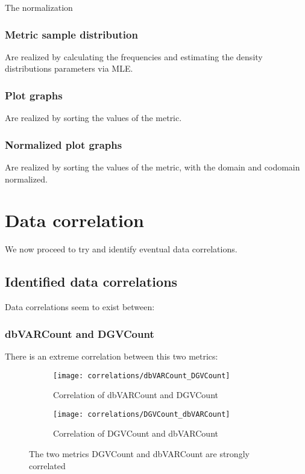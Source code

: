 The normalization

\subsection{Metric sample distribution}
Are realized by calculating the frequencies and estimating the density distributions parameters via MLE.

\subsection{Plot graphs}
Are realized by sorting the values of the metric.

\subsection{Normalized plot graphs}
Are realized by sorting the values of the metric, with the domain and codomain normalized.




\chapter{Data correlation}
We now proceed to try and identify eventual data correlations.


\clearpage


\section{Identified data correlations}
Data correlations seem to exist between:

\subsection{dbVARCount and DGVCount}
There is an extreme correlation between this two metrics:

\begin{figure}
	\begin{subfigure}{0.3\textwidth}
		\texttt{[image: correlations/dbVARCount\_DGVCount]}
		\caption{Correlation of dbVARCount and DGVCount}
	\end{subfigure}
	\begin{subfigure}{0.3\textwidth}
		\texttt{[image: correlations/DGVCount\_dbVARCount]}
		\caption{Correlation of DGVCount and dbVARCount}
	\end{subfigure}
	\caption{The two metrics DGVCount and dbVARCount are strongly correlated}
\end{figure}

